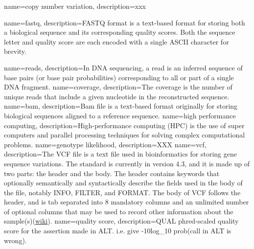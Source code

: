 \makeglossaries

{
    name=copy number variation,
    description={xxx }
}


{
    name=fastq,
    description={FASTQ format is a text-based format for storing both a biological sequence and its corresponding quality scores. Both the sequence letter and quality score are each encoded with a single ASCII character for brevity. }
}

{
    name=reads,
    description={In DNA sequencing, a read is an inferred sequence of base pairs (or base pair probabilities) corresponding to all or part of a single DNA fragment.}
}
{
    name=coverage,
    description={The coverage is the number of unique reads that include a given nucleotide in the reconstructed sequence.}
}
{
    name=bam,
    description={Bam file is a text-based format originally for storing biological sequences aligned to a reference sequence.}
}
{
    name=high performance computing,
    description={High-performance computing (HPC) is the use of super computers and parallel processing techniques for solving complex computational problems.}
}
{
    name=genotype likelihood,
    description={XXX}
}
{
    name=vcf,
    description={The VCF file is a text file used in bioinformatics for storing gene sequence variations. The standard is currently in version 4.3, and it is made up of two parts: the header and the body. The header contains keywords that optionally semantically and syntactically describe the fields used in the body of the file, notably INFO, FILTER, and FORMAT. The body of VCF follows the header, and is tab separated into 8 mandatory columns and an unlimited number of optional columns that may be used to record other information about the sample(s)(\href{http://en.wikipedia.org/wiki/Variant_Call_Format}{wiki}).}
}
{
    name=quality score,
    description={QUAL phred-scaled quality score for the assertion made in ALT. i.e. give -10log_10 prob(call in ALT is wrong).}
}
